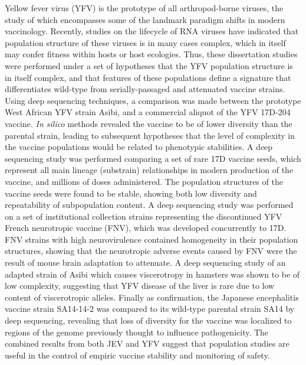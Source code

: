 \documentclass[11pt]{report}	%
\theoremstyle{definition}
\theoremstyle{remark}
\begin{document}
%
\utabstract
{}%
\indent
Yellow fever virus (YFV) is the prototype of all arthropod-borne viruses, the study of which encompasses some of the landmark 
paradigm shifts in modern vaccinology. Recently, studies on the lifecycle of RNA viruses have indicated that population structure of these
viruses is in many cases complex, which in itself may confer fitness within hosts or host ecologies. Thus, these dissertation studies were performed
under a set of hypotheses that the YFV population structure is in itself complex, and that features of these populations define a signature that
differentiates wild-type from serially-passaged and attenuated vaccine strains. Using deep sequencing techniques, a comparison was made between the
prototype West African YFV strain Asibi, and a commercial aliquot of the YFV 17D-204 vaccine. \emph{In silico} methods revealed the vaccine to be of lower
diversity than the parental strain, leading to subsequent hypotheses that the level of complexity in the vaccine populations would be related to phenotypic stabilities. A deep sequencing study was performed comparing a set of rare 17D vaccine seeds, which represent all main
lineage (substrain) relationships in modern production of the vaccine, and millions of doses administered. The population structures of the vaccine seeds
were found to be stable, showing both low diversity and repeatability of subpopulation content. A deep sequencing study was performed on a set of institutional collection strains representing the discontinued YFV French neurotropic vaccine (FNV), which was developed concurrently to 17D. FNV strains with high neurovirulence contained homogeneity in their population structures, showing that the neurotropic adverse events caused by FNV were the result of mouse brain adaptation to attenuate. A deep sequencing study of an adapted strain
of Asibi which causes viscerotropy in hamsters was shown to be of low complexity, suggesting that YFV disease of the liver is rare due to low content of viscerotropic alleles. Finally as confirmation, the Japanese encephalitis vaccine strain SA14-14-2 was compared to its wild-type parental strain SA14 by deep sequencing, revealing that loss of diversity for 
the vaccine was localized to regions of the genome previously thought to influence pathogenicity. The combined results from both JEV and YFV suggest that population studies are
useful in the control of empiric vaccine stability and monitoring of safety.
\end{document}
